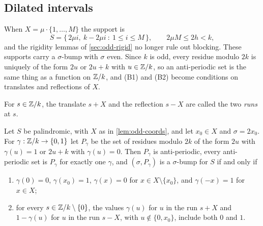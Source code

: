 \subsection{Dilated intervals}
\label{sec:odd-dil}

When $X=\mu\cdot\{1,\dots,M\}$ the support is
\begin{equation}
S=\{\,2\mu i,\ k-2\mu i\ :\ 1\le i\le M\,\},\qquad 2\mu M\le 2h<k,
\label{eq:odd-prog}
\end{equation}
and the rigidity lemmas of \autoref{sec:odd-rigid} no longer rule out
blocking. These supports carry a $\sigma$-bump with $\sigma$ even. Since $k$
is odd, every residue modulo $2k$ is uniquely of the form $2u$ or $2u+k$ with
$u\in\mathbb{Z}/k$, so an anti-periodic set is the same thing as a function on
$\Z/k$, and (B1) and (B2) become conditions on translates and reflections of
$X$.

For $s\in\mathbb{Z}/k$, the translate $s+X$ and the reflection $s-X$ are called the
two \emph{runs} at $s$.

\begin{lemma}[carriers on $\Z/k$]
\label{lem:odd-fold}
Let $S$ be palindromic, with $X$ as in \autoref{lem:odd-coords}, and let
$x_0\in X$ and $\sigma=2x_0$. For $\gamma:\mathbb{Z}/k\to\{0,1\}$ let $P_\gamma$ be
the set of residues modulo $2k$ of the form $2u$ with $\gamma(u)=1$ or $2u+k$
with $\gamma(u)=0$. Then $P_\gamma$ is anti-periodic, every anti-periodic set
is $P_\gamma$ for exactly one $\gamma$, and $(\sigma,P_\gamma)$ is a
$\sigma$-bump for $S$ if and only if
\begin{enumerate}
\item[(F1)] $\gamma(0)=0$, $\gamma(x_0)=1$, $\gamma(x)=0$ for
$x\in X\setminus\{x_0\}$, and $\gamma(-x)=1$ for $x\in X$;
\item[(F2)] for every $s\in\mathbb{Z}/k\setminus\{0\}$, the values $\gamma(u)$ for
$u$ in the run $s+X$ and $1-\gamma(u)$ for $u$ in the run $s-X$, with
$u\notin\{0,x_0\}$,
include both $0$ and $1$.
\end{enumerate}
\end{lemma}

